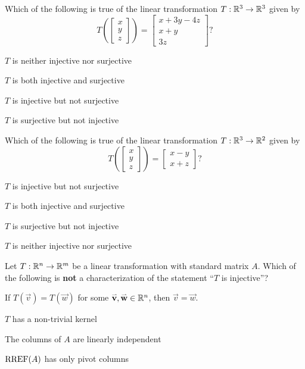 \begin{readinessAssuranceTest}
\item Which of the following is true of the linear transformation $T: \mathbb{R}^3 \rightarrow \mathbb{R}^3$ given by $$T\left(\begin{bmatrix} x \\ y \\ z \end{bmatrix} \right) = \begin{bmatrix} x+3y-4z \\ x+y \\ 3z \end{bmatrix}?$$
\begin{readinessAssuranceTestChoices}
\item $T$ is neither injective nor surjective
\item $T$ is both injective and surjective %
\item $T$ is injective but not surjective
\item $T$ is surjective but not injective
\end{readinessAssuranceTestChoices}


\item Which of the following is true of the linear transformation $T:\mathbb{R}^3 \rightarrow \mathbb{R}^2$ given by $$T\left(\begin{bmatrix} x \\ y \\ z \end{bmatrix} \right) = \begin{bmatrix} x-y \\ x+z \end{bmatrix} ?$$
\begin{readinessAssuranceTestChoices}
\item $T$ is injective but not surjective
\item $T$ is both injective and surjective
\item $T$ is surjective but not injective %
\item $T$ is neither injective nor surjective
\end{readinessAssuranceTestChoices}


\item Let $T: \mathbb{R}^n \rightarrow \mathbb{R}^m$ be a linear transformation with standard matrix $A$.  Which of the following is {\bf not} a characterization of the statement ``$T$ is injective''?
\begin{readinessAssuranceTestChoices}
\item If $T(\vec{v})=T(\vec{w})$ for some $\mathbf{\accentset{\rightharpoonup}{v}}, \mathbf{\accentset{\rightharpoonup}{w}} \in \mathbb{R}^n$, then $\vec{v}=\vec{w}$.
\item $T$ has a non-trivial kernel %
\item The columns of $A$ are linearly independent
\item $\operatorname{RREF}(A)$ has only pivot columns
\end{readinessAssuranceTestChoices}



\end{readinessAssuranceTest}
